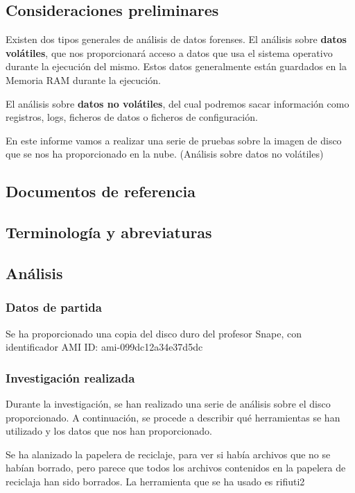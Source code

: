 \subsection{Consideraciones preliminares}

Existen dos tipos generales de análisis de datos forenses.
El análisis sobre \textbf{datos volátiles}, que nos proporcionará acceso a datos que usa el sistema operativo durante la ejecución del mismo.
Estos datos generalmente están guardados en la Memoria RAM durante la ejecución. 

El análisis sobre \textbf{datos no volátiles}, del cual podremos sacar información como registros, logs, ficheros de datos o ficheros de configuración.

En este informe vamos a realizar una serie de pruebas sobre la imagen de disco que se nos ha proporcionado en la nube. (Análisis sobre datos no volátiles) 

\subsection{Documentos de referencia}
\printbibliography
\subsection{Terminología y abreviaturas}
\printglossaries
\subsection{Análisis}
\subsubsection{Datos de partida}

Se ha proporcionado una copia del disco duro del profesor Snape, con identificador AMI ID: ami-099dc12a34e37d5dc 

\subsubsection{Investigación realizada}

Durante la investigación, se han realizado una serie de análisis sobre el disco proporcionado.
A continuación, se procede a describir qué herramientas se han utilizado y los datos que nos han proporcionado.

Se ha alanizado la papelera de reciclaje, para ver si había archivos que no se habían borrado, pero parece que todos los archivos contenidos en la papelera de reciclaja han sido borrados. La herramienta que se ha usado es rifiuti2 \cite{rifiuti2}

